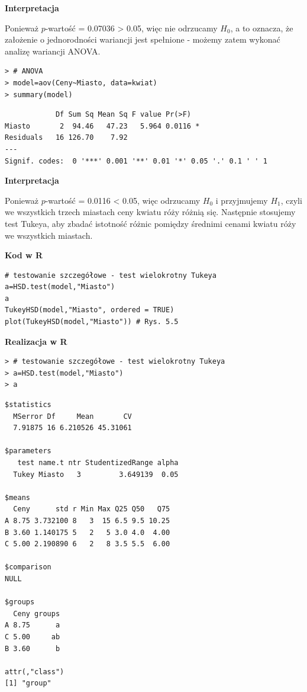 \documentclass[12pt,B5paper,]{book}
\begin{document}
\vspace{0.8cm} \textbf{Interpretacja}

Ponieważ \(p\)-wartość = 0.07036 \textgreater{} 0.05, więc nie odrzucamy
\(H_0\), a to oznacza, że założenie o jednorodności wariancji jest
spełnione - możemy zatem wykonać analizę wariancji ANOVA.

\vspace{0.8cm}

\begin{verbatim}
> # ANOVA
> model=aov(Ceny~Miasto, data=kwiat)
> summary(model)
\end{verbatim}

\begin{verbatim}
            Df Sum Sq Mean Sq F value Pr(>F)  
Miasto       2  94.46   47.23   5.964 0.0116 *
Residuals   16 126.70    7.92                 
---
Signif. codes:  0 '***' 0.001 '**' 0.01 '*' 0.05 '.' 0.1 ' ' 1
\end{verbatim}

\vspace{0.8cm} \textbf{Interpretacja}

Ponieważ \(p\)-wartość = 0.0116 \textless{} 0.05, więc odrzucamy \(H_0\)
i przyjmujemy \(H_1\), czyli we wszystkich trzech miastach ceny kwiatu
róży różnią się. Następnie stosujemy test Tukeya, aby zbadać istotność
różnic pomiędzy średnimi cenami kwiatu róży we wszystkich miastach.
\vspace{0.8cm}

\textbf{Kod w R}

\begin{verbatim}
# testowanie szczegółowe - test wielokrotny Tukeya
a=HSD.test(model,"Miasto")
a
TukeyHSD(model,"Miasto", ordered = TRUE)  
plot(TukeyHSD(model,"Miasto")) # Rys. 5.5
\end{verbatim}

\vspace{0.8cm} \textbf{Realizacja w R}

\begin{verbatim}
> # testowanie szczegółowe - test wielokrotny Tukeya
> a=HSD.test(model,"Miasto")
> a
\end{verbatim}

\begin{verbatim}
$statistics
  MSerror Df     Mean       CV
  7.91875 16 6.210526 45.31061

$parameters
   test name.t ntr StudentizedRange alpha
  Tukey Miasto   3         3.649139  0.05

$means
  Ceny      std r Min Max Q25 Q50   Q75
A 8.75 3.732100 8   3  15 6.5 9.5 10.25
B 3.60 1.140175 5   2   5 3.0 4.0  4.00
C 5.00 2.190890 6   2   8 3.5 5.5  6.00

$comparison
NULL

$groups
  Ceny groups
A 8.75      a
C 5.00     ab
B 3.60      b

attr(,"class")
[1] "group"
\end{verbatim}
\end{document}
